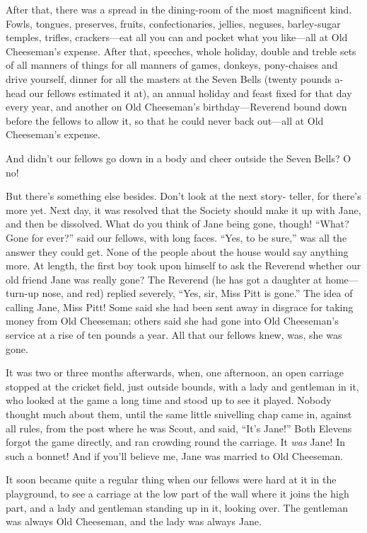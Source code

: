 After that, there was a spread in the dining-room of the most
magnificent kind.  Fowls, tongues, preserves, fruits,
confectionaries, jellies, neguses, barley-sugar temples, trifles,
crackers---eat all you can and pocket what you like---all at Old
Cheeseman's expense.  After that, speeches, whole holiday, double
and treble sets of all manners of things for all manners of games,
donkeys, pony-chaises and drive yourself, dinner for all the masters
at the Seven Bells (twenty pounds a-head our fellows estimated it
at), an annual holiday and feast fixed for that day every year, and
another on Old Cheeseman's birthday---Reverend bound down before the
fellows to allow it, so that he could never back out---all at Old
Cheeseman's expense.

And didn't our fellows go down in a body and cheer outside the Seven
Bells?  O no!

But there's something else besides.  Don't look at the next story-%
teller, for there's more yet.  Next day, it was resolved that the
Society should make it up with Jane, and then be dissolved.  What do
you think of Jane being gone, though!  ``What?  Gone for ever?'' said
our fellows, with long faces.  ``Yes, to be sure,'' was all the answer
they could get.  None of the people about the house would say
anything more.  At length, the first boy took upon himself to ask
the Reverend whether our old friend Jane was really gone?  The
Reverend (he has got a daughter at home---turn-up nose, and red)
replied severely, ``Yes, sir, Miss Pitt is gone.''  The idea of
calling Jane, Miss Pitt!  Some said she had been sent away in
disgrace for taking money from Old Cheeseman; others said she had
gone into Old Cheeseman's service at a rise of ten pounds a year.
All that our fellows knew, was, she was gone.

It was two or three months afterwards, when, one afternoon, an open
carriage stopped at the cricket field, just outside bounds, with a
lady and gentleman in it, who looked at the game a long time and
stood up to see it played.  Nobody thought much about them, until
the same little snivelling chap came in, against all rules, from the
post where he was Scout, and said, ``It's Jane!''  Both Elevens forgot
the game directly, and ran crowding round the carriage.  It \emph{was}
Jane!  In such a bonnet!  And if you'll believe me, Jane was married
to Old Cheeseman.

It soon became quite a regular thing when our fellows were hard at
it in the playground, to see a carriage at the low part of the wall
where it joins the high part, and a lady and gentleman standing up
in it, looking over.  The gentleman was always Old Cheeseman, and
the lady was always Jane.

